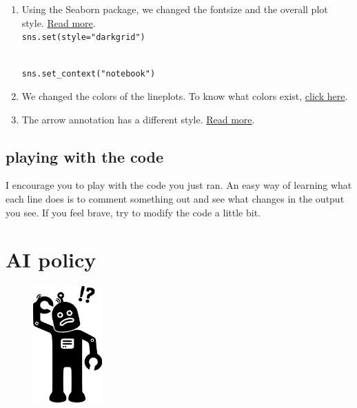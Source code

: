 \documentclass[
  letterpaper,
  DIV=11,
  numbers=noendperiod,
  oneside]{scrreprt}
\providecommand{\tightlist}{%
  \setlength{\itemsep}{0pt}\setlength{\parskip}{0pt}}\usepackage{longtable,booktabs,array}
\begin{document}
\begin{enumerate}
\def\labelenumi{\arabic{enumi}.}
\tightlist
\item
  Using the Seaborn package, we changed the fontsize and the overall
  plot style.
  \href{https://seaborn.pydata.org/tutorial/aesthetics.html}{Read
  more}.\\
  \texttt{sns.set(style="darkgrid")}\strut \\
  \texttt{sns.set\_context("notebook")}
\item
  We changed the colors of the lineplots. To know what colors exist,
  \href{https://matplotlib.org/stable/gallery/color/named_colors.html}{click
  here}.
\item
  The arrow annotation has a different style.
  \href{https://jakevdp.github.io/PythonDataScienceHandbook/04.09-text-and-annotation.html\#Arrows-and-Annotation}{Read
  more}.
\end{enumerate}

\hypertarget{playing-with-the-code}{%
\section{playing with the code}\label{playing-with-the-code}}

I encourage you to play with the code you just ran. An easy way of
learning what each line does is to comment something out and see what
changes in the output you see. If you feel brave, try to modify the code
a little bit.

\hypertarget{ai-policy}{%
\chapter{AI policy}\label{ai-policy}}

\begin{figure}

{\centering \includegraphics[width=1.04167in,height=\textheight]{basics/robot-scratching_transparent3.png}

}

\end{figure}
\end{document}
